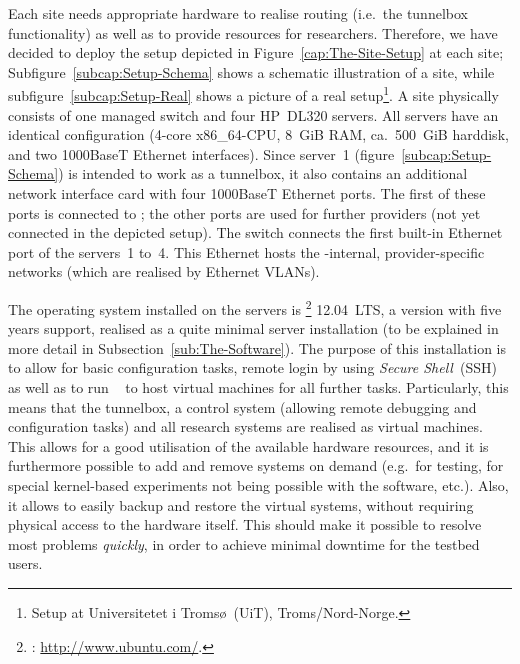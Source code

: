 Each  site needs appropriate hardware to realise routing (i.e.\ the tunnelbox functionality) as well as to provide resources for researchers. Therefore, we have decided to deploy the setup depicted in Figure~\ref{cap:The-Site-Setup} at each site; Subfigure~\ref{subcap:Setup-Schema} shows a schematic illustration of a site, while subfigure~\ref{subcap:Setup-Real} shows a picture of a real setup\footnote{Setup at Universitetet i Tromsø~(UiT), Troms/Nord-Norge.}.
A site physically consists of one managed switch and four HP~DL320 servers. All servers have an identical configuration (4-core x86\_64-CPU, 8~GiB RAM, ca.\ 500~GiB harddisk, and two 1000BaseT Ethernet interfaces). Since server~1 (figure~\ref{subcap:Setup-Schema}) is intended to work as a tunnelbox, it also contains an additional network interface card with four 1000BaseT Ethernet ports. The first of these ports is connected to ; the other ports are used for further providers (not yet connected in the depicted setup). The switch connects the first built-in Ethernet port of the servers~1 to~4. This Ethernet hosts the -internal, provider-specific networks (which are realised by Ethernet VLANs).

The operating system installed on the servers is \footnote{: \url{http://www.ubuntu.com/}.} 12.04~LTS, a version with five years support, realised as a quite minimal server installation (to be explained in more detail in Subsection~\ref{sub:The-Software}). The purpose of this installation is to allow for basic configuration tasks, remote login by using \emph{Secure Shell}~(SSH)~\cite{RFC4254} as well as to run ~\cite{VirtualBoxUserManual} to host virtual machines for all further tasks. Particularly, this means that the tunnelbox, a control system (allowing remote debugging and configuration tasks) and all research systems are realised as virtual machines. This allows for a good utilisation of the available hardware resources, and it is furthermore possible to add and remove systems on demand (e.g.\ for testing, for special kernel-based experiments not being possible with the  software, etc.). Also, it allows to easily backup and restore the virtual systems, without requiring physical access to the hardware itself. This should make it possible to resolve most problems \emph{quickly}, in order to achieve minimal downtime for the testbed users.

